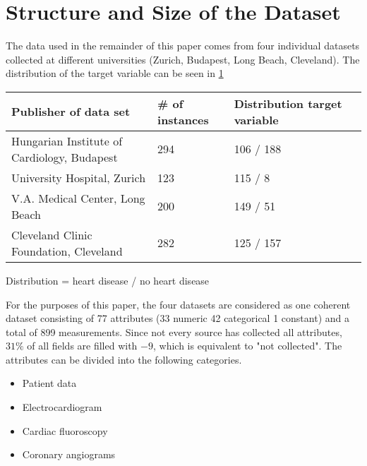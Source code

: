\section{Structure and Size of the Dataset} \label{sec:dataUnderstanding}


The data used in the remainder of this paper comes from four individual datasets collected at different universities (Zurich, Budapest, Long Beach, Cleveland). The distribution of the target variable can be seen in \cref{table:datasets}
\begin{table}[h]
    \label{table:datasets}
    \begin{footnotesize}
        \begin{tabular}{|l|l|l|l|}
            \hline
            \textbf{Publisher of data set}              & \textbf{\# of instances} & \textbf{Distribution target variable} \\ \hline
            Hungarian Institute of Cardiology, Budapest & 294                      & 106 / 188                             \\ \hline
            University Hospital, Zurich                 & 123                      & 115 / 8                               \\ \hline
            V.A. Medical Center, Long Beach             & 200                      & 149 / 51                              \\ \hline
            Cleveland Clinic Foundation, Cleveland      & 282                      & 125 / 157                             \\ \hline
        \end{tabular}
    \end{footnotesize}
\end{table}
\begin{center}
    \centering
    Distribution = heart disease / no heart disease
\end{center}
For the purposes of this paper, the four datasets are considered as one coherent dataset consisting of 77 attributes (33 numeric 42 categorical 1 constant) and a total of 899 measurements. 
Since not every source has collected all attributes, $31\%$ of all fields are filled with $-9$, which is equivalent to "not collected".  
The attributes can be divided into the following categories. 
\begin{multicols}{2}
    \begin{itemize}
        \item Patient data
        \item Electrocardiogram
        \item Cardiac fluoroscopy
        \item Coronary angiograms
    \end{itemize}
\end{multicols}
